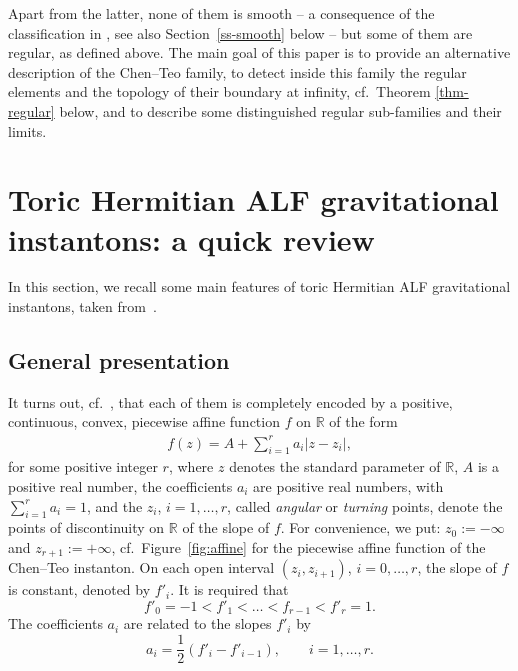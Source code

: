 \documentclass[10pt,a4paper]{amsart}
\numberwithin{equation}{section}
\begin{document}
Apart from the latter, none of them is smooth -- a consequence of the classification in \cite{BG}, see also Section~\ref{ss-smooth} below -- but some of them are regular, as defined above.
The main goal of this paper is to provide an alternative description of the Chen--Teo family, to detect inside this family the regular elements and the topology of their boundary at infinity, cf.\ Theorem \ref{thm-regular} below, and to describe some distinguished regular sub-families and their limits.


\section{Toric Hermitian ALF gravitational instantons: a quick review} In this section, we recall some main features of toric Hermitian ALF gravitational instantons, taken from~\cite{BG}.

\subsection{General presentation} It turns out, cf.\ \cite[Corollary 5.2]{BG}, that each of them is completely encoded by a positive, continuous, convex, piecewise affine function $f$ on $\mathbb{R}$ of the form
\begin{gather} \label{f} f (z) = A + \sum _{i = 1} ^r a_i |z - z_i|, \end{gather}
for some positive integer $r$, where $z$ denotes the standard parameter of $\mathbb{R}$, $A$ is a positive real number, the coefficients $a _i$ are positive real numbers, with $\sum _{i = 1}^r a_i = 1$, and the $z_i$, $i = 1, \dots, r$, called {\it angular} or {\it turning} points, denote the points of discontinuity on $\mathbb{R}$ of the slope of $f$. For convenience, we put: $z _0 := - \infty$ and $z_{r + 1} := + \infty$, cf.\ Figure~\ref{fig:affine} for the piecewise affine function of the Chen--Teo instanton. On each open interval $(z_i, z_{i + 1})$, $i = 0, \dots, r$, the slope of $f$ is constant, denoted by $f' _i$. It is required that
\[
 f'_0 = - 1 < f'_1 < \dots < f _{r-1} < f'_r = 1.
 \]
The coefficients $a_i$ are related to the slopes $f'_i$ by
\[ a _i = \frac{1}{2} (f'_i - f'_{i - 1}), \qquad i = 1, \dots, r.\]
\end{document}
